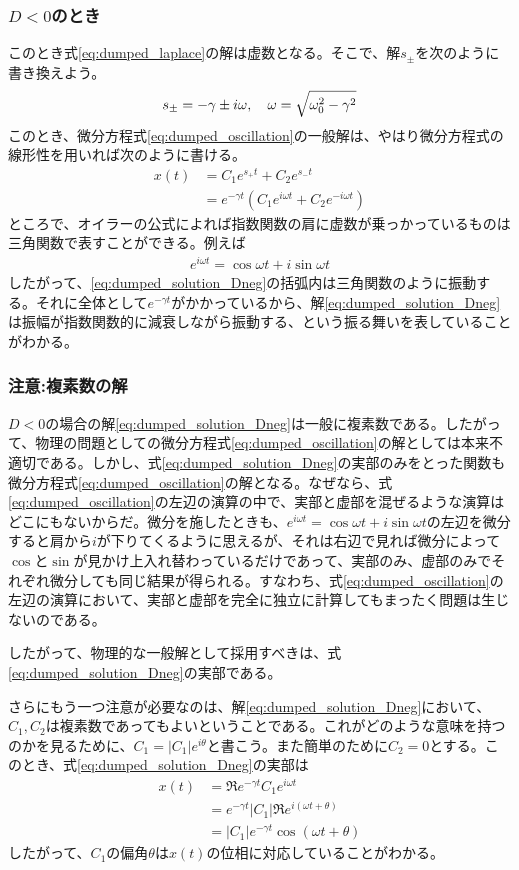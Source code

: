 \documentclass[uplatex,dvipdfmx]{jsarticle}
\begin{document}
\subsubsection{$D<0$のとき}
このとき式\eqref{eq:dumped_laplace}の解は虚数となる。そこで、解$s_\pm$を次のように書き換えよう。
\begin{align}
	s_{\pm} = -\gamma \pm i\omega \qc{\omega = \sqrt{\omega_0^2 - \gamma^2}}	
\end{align}
このとき、微分方程式\eqref{eq:dumped_oscillation}の一般解は、やはり微分方程式の線形性を用いれば次のように書ける。
\begin{align}
	x(t) &= C_1 e^{s_+t} + C_2 e^{s_-t} \nonumber \\
		&= e^{-\gamma t}(C_1 e^{i\omega t} + C_2 e^{-i\omega t}) \label{eq:dumped_solution_Dneg}
\end{align}
ところで、オイラーの公式によれば指数関数の肩に虚数が乗っかっているものは三角関数で表すことができる。例えば
\begin{align}
	e^{i\omega t} = \cos{\omega t} + i\sin{\omega t}
\end{align}
したがって、\eqref{eq:dumped_solution_Dneg}の括弧内は三角関数のように振動する。それに全体として$e^{-\gamma t}$がかかっているから、解\eqref{eq:dumped_solution_Dneg}は振幅が指数関数的に減衰しながら振動する、という振る舞いを表していることがわかる。

\subsubsection{注意:複素数の解}
$D<0$の場合の解\eqref{eq:dumped_solution_Dneg}は一般に複素数である。したがって、物理の問題としての微分方程式\eqref{eq:dumped_oscillation}の解としては本来不適切である。しかし、式\eqref{eq:dumped_solution_Dneg}の実部のみをとった関数も微分方程式\eqref{eq:dumped_oscillation}の解となる。なぜなら、式\eqref{eq:dumped_oscillation}の左辺の演算の中で、実部と虚部を混ぜるような演算はどこにもないからだ。微分を施したときも、$e^{i\omega t}=\cos{\omega t} + i\sin{\omega t}$の左辺を微分すると肩から$i$が下りてくるように思えるが、それは右辺で見れば微分によって$\cos$と$\sin$が見かけ上入れ替わっているだけであって、実部のみ、虚部のみでそれぞれ微分しても同じ結果が得られる。すなわち、式\eqref{eq:dumped_oscillation}の左辺の演算において、実部と虚部を完全に独立に計算してもまったく問題は生じないのである。

したがって、物理的な一般解として採用すべきは、式\eqref{eq:dumped_solution_Dneg}の実部である。

さらにもう一つ注意が必要なのは、解\eqref{eq:dumped_solution_Dneg}において、$C_1, C_2$は複素数であってもよいということである。これがどのような意味を持つのかを見るために、$C_1 = |C_1|e^{i\theta}$と書こう。また簡単のために$C_2 = 0$とする。このとき、式\eqref{eq:dumped_solution_Dneg}の実部は
\begin{align}
	x(t) &= \Re{e^{-\gamma t}C_1 e^{i\omega t}} \nonumber \\
		&= e^{-\gamma t}|C_1|\Re{e^{i(\omega t + \theta)}} \nonumber \\
		&= |C_1| e^{-\gamma t} \cos(\omega t + \theta)
\end{align}
したがって、$C_1$の偏角$\theta$は$x(t)$の位相に対応していることがわかる。
\end{document}
